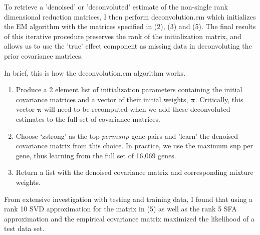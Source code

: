 \documentclass[10pt]{article}
\begin{document}
\begin{itemize}


To retrieve a 'denoised' or 'deconvoluted' estimate of the non-single rank dimensional reduction matrices, I then perform deconvolution.em which initializes the EM algorithm with  the matrices specified in (2), (3) and (5). The final results of this iterative procedure preserves the rank of the initialization matrix, and allows us to use the 'true' effect component as missing data in deconvoluting the prior covariance matrices.

In brief, this is how the deconvolution.em algorithm works.

\begin{enumerate}
\item Produce a 2 element list of initialization parameters containing the initial covariance matrices and a vector of their initial weights, $\mathbf{\pi}$. Critically, this vector $\mathbf{\pi}$ will need to be recomputed when we add these deconvoluted estimates to the full set of covariance matrices.

\item Choose `zstrong' as the top $permsnp$ gene-pairs  and 'learn' the denoised covariance matrix from this choice. In practice, we use the maximum snp per gene, thus learning from the full set of 16,069 genes.
\item Return a list with the denoised covariance matrix and corresponding mixture weights.
\end {enumerate}

From extensive investigation with testing and training data, I found that using a rank 10 SVD approximation for the matrix in (5) as well as the rank 5 SFA approximation and the empirical covariance matrix maximized the likelihood of a test data set. 


\end{itemize}
\end{document}
